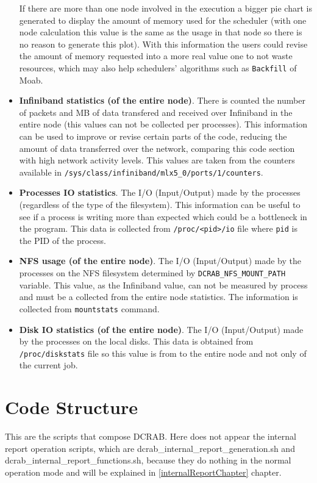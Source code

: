 \documentclass[10pt,a4paper]{report}
\begin{document}
\begin{itemize}
	If there are more than one node involved in the execution a bigger pie chart is generated to display the amount of memory used for the scheduler (with one node calculation this value is the same as the usage in that node so there is no reason to generate this plot). With this information the users could revise the amount of memory requested into a more real value one to not waste resources, which may also help schedulers' algorithms such as \verb+Backfill+ of Moab.
	\item \textbf{Infiniband statistics (of the entire node)}. There is counted the number of packets and MB of data transfered and received over Infiniband in the entire node (this values can not be collected per processes). This information can be used to improve or revise certain parts of the code, reducing the amount of data transferred over the network, comparing this code section with high network activity levels. This values are taken from the counters available in \verb+/sys/class/infiniband/mlx5_0/ports/1/counters+.
	\item \textbf{Processes IO statistics}. The I/O (Input/Output) made by the processes (regardless of the type of the filesystem). This information can be useful to see if a process is writing more than expected which could be a bottleneck in the program. This data is collected from \verb+/proc/<pid>/io+ file where \verb+pid+ is the PID of the process.
	\item \textbf{NFS usage (of the entire node)}. The I/O (Input/Output) made by the processes on the NFS filesystem determined by \verb+DCRAB_NFS_MOUNT_PATH+ variable. This value, as the Infiniband value, can not be measured by process and must be a collected from the entire node statistics. The information is collected from \verb+mountstats+ command.
	\item \textbf{Disk IO statistics (of the entire node)}. The I/O (Input/Output) made by the processes on the local disks. This data is obtained from \verb+/proc/diskstats+ file so this value is from to the entire node and not only of the current job.
\end{itemize}

\section{Code Structure}

This are the scripts that compose DCRAB. Here does not appear the internal report operation scripts, which are dcrab\_internal\_report\_generation.sh and dcrab\_internal\_report\_functions.sh, because they do nothing in the normal operation mode and will be explained in \ref{internalReportChapter} chapter.
\end{document}
